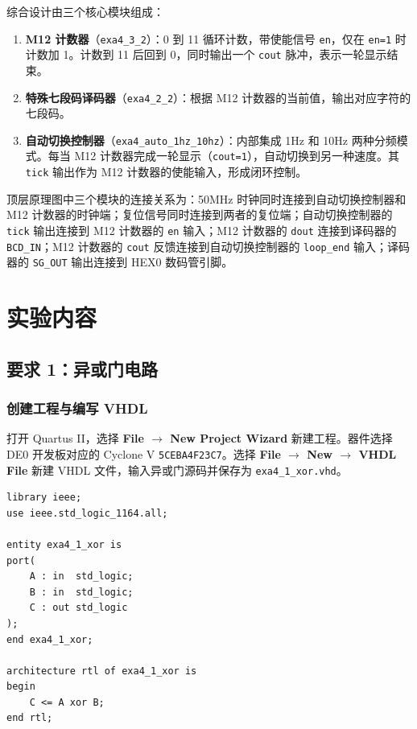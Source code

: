 \documentclass[12pt]{ctexart}
\begin{document}
综合设计由三个核心模块组成：

\begin{enumerate}
    \item \textbf{M12 计数器}（\texttt{exa4\_3\_2}）：0 到 11 循环计数，带使能信号 \texttt{en}，仅在 \texttt{en=1} 时计数加 1。计数到 11 后回到 0，同时输出一个 \texttt{cout} 脉冲，表示一轮显示结束。
    \item \textbf{特殊七段码译码器}（\texttt{exa4\_2\_2}）：根据 M12 计数器的当前值，输出对应字符的七段码。
    \item \textbf{自动切换控制器}（\texttt{exa4\_auto\_1hz\_10hz}）：内部集成 1Hz 和 10Hz 两种分频模式。每当 M12 计数器完成一轮显示（\texttt{cout=1}），自动切换到另一种速度。其 \texttt{tick} 输出作为 M12 计数器的使能输入，形成闭环控制。
\end{enumerate}

顶层原理图中三个模块的连接关系为：50MHz 时钟同时连接到自动切换控制器和 M12 计数器的时钟端；复位信号同时连接到两者的复位端；自动切换控制器的 \texttt{tick} 输出连接到 M12 计数器的 \texttt{en} 输入；M12 计数器的 \texttt{dout} 连接到译码器的 \texttt{BCD\_IN}；M12 计数器的 \texttt{cout} 反馈连接到自动切换控制器的 \texttt{loop\_end} 输入；译码器的 \texttt{SG\_OUT} 输出连接到 HEX0 数码管引脚。

\section{实验内容}

\subsection{要求 1：异或门电路}

\subsubsection{创建工程与编写 VHDL}

打开 Quartus II，选择 \textbf{File $\rightarrow$ New Project Wizard} 新建工程。器件选择 DE0 开发板对应的 Cyclone V \texttt{5CEBA4F23C7}。选择 \textbf{File $\rightarrow$ New $\rightarrow$ VHDL File} 新建 VHDL 文件，输入异或门源码并保存为 \texttt{exa4\_1\_xor.vhd}。

\begin{verbatim}
library ieee;
use ieee.std_logic_1164.all;

entity exa4_1_xor is
port(
    A : in  std_logic;
    B : in  std_logic;
    C : out std_logic
);
end exa4_1_xor;

architecture rtl of exa4_1_xor is
begin
    C <= A xor B;
end rtl;
\end{verbatim}
\label{lst:xor}
\end{document}
